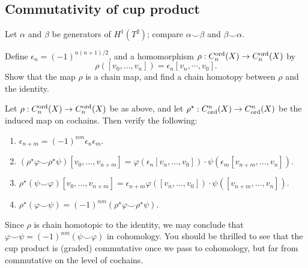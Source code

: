 \documentclass[12pt]{pset}
\newcommand{\cupp}{\smallsmile}
\newcommand{\Ct}{C_{\mbox{\scriptsize ord}}}
\newcommand{\Chaint}{C^{\mbox{\scriptsize ord}}}
\begin{document}
\subsection*{Commutativity of cup product}

\begin{problem}
  Let $\alpha$ and $\beta$ be generators of $H^1(T^2)$; compare
  $\alpha \cupp \beta$ and $\beta \cupp \alpha$.
\end{problem}

\begin{problem}
  Define $\epsilon_n = \left(-1\right)^{n(n+1)/2}$, and a homomorphism $\rho :
  \Chaint_n(X) \to \Chaint_n(X)$ by
  $$
  \rho( [v_0,\ldots,v_n] ) = \epsilon_n [v_n, \cdots, v_0].
  $$
  Show that the map $\rho$ is a chain map, and find a chain homotopy
  between $\rho$ and the identity.
\end{problem}


\begin{problem}
Let $\rho : \Chaint_n(X) \to \Chaint_n(X)$ be as above, and let $\rho^\star :
\Ct^n(X) \to \Ct^n(X)$ be the induced map on cochains. Then verify the following:
  \begin{enumerate}[\bfseries (1)]
  \item $\epsilon_{n+m} = (-1)^{nm} \epsilon_n \epsilon_m$.
  \item $(\rho^\star \varphi \cupp \rho^\star \psi) [v_0,\ldots,v_{n+m}] =
    \varphi( \epsilon_n [v_n,\ldots,v_0] ) \cdot \psi( \epsilon_m[v_{n+m},\ldots,v_n] )$.
  \item $\rho^\star (\psi \cupp \varphi) [v_0,\ldots,v_{n+m}] =
    \epsilon_{n+m} \varphi( [v_n,\ldots,v_0] ) \cdot \psi( [v_{n+m},\ldots,v_n] )$.
  \item $\rho^\star (\varphi \cupp \psi) = (-1)^{nm} \left( \rho^\star \varphi \cupp \rho^\star \psi \right)$.
  \end{enumerate}
  Since $\rho$ is chain homotopic to the identity, we may conclude
  that $\varphi \cupp \psi = (-1)^{nm} \left( \psi \cupp \varphi
  \right)$ in cohomology.  You should be thrilled to see that the cup
  product is (graded) commutative once we pass to cohomology, but far
  from commutative on the level of cochains.
\end{problem}
\end{document}
